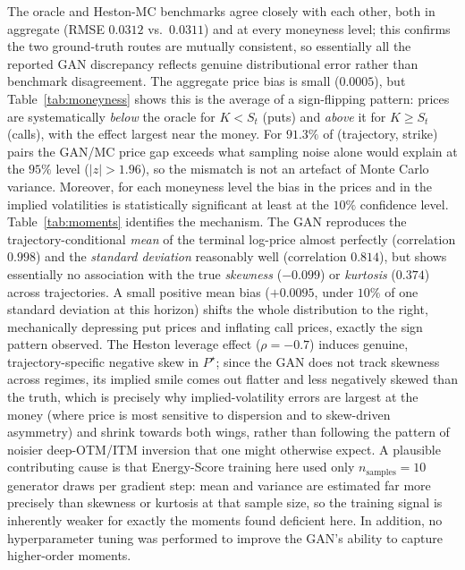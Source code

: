 The oracle and Heston-MC benchmarks agree closely with each other, both
in aggregate (RMSE $0.0312$ vs.\ $0.0311$) and at every moneyness level;
this confirms the two ground-truth routes are mutually consistent, so
essentially all the reported GAN discrepancy reflects genuine
distributional error rather than benchmark disagreement. The aggregate
price bias is small ($0.0005$), but Table~\ref{tab:moneyness} shows this
is the average of a sign-flipping pattern: prices are systematically
\emph{below} the oracle for $K<S_t$ (puts) and \emph{above} it for
$K\ge S_t$ (calls), with the effect largest near the money. For $91.3\%$
of (trajectory, strike) pairs the GAN/MC price gap exceeds what sampling
noise alone would explain at the $95\%$ level ($|z|>1.96$), so the
mismatch is not an artefact of Monte Carlo variance. 
Moreover, for each moneyness level the bias in the prices and in the implied volatilities is statistically significant at least at the $10\%$ confidence level.\\

Table~\ref{tab:moments} identifies the mechanism. The GAN reproduces the
trajectory-conditional \emph{mean} of the terminal log-price almost
perfectly (correlation $0.998$) and the \emph{standard deviation}
reasonably well (correlation $0.814$), but shows essentially no
association with the true \emph{skewness} ($-0.099$) or \emph{kurtosis}
($0.374$) across trajectories. A small positive mean bias ($+0.0095$,
under $10\%$ of one standard deviation at this horizon) shifts the whole
distribution to the right, mechanically depressing put prices and
inflating call prices, exactly the sign pattern observed. The
Heston leverage effect ($\rho=-0.7$) induces genuine, trajectory-specific
negative skew in $P^\star$; since the GAN does not track skewness
across regimes, its implied smile comes out flatter and less negatively
skewed than the truth, which is precisely why implied-volatility errors
are largest at the money (where price is most sensitive to dispersion
and to skew-driven asymmetry) and shrink towards both wings, rather than
following the pattern of noisier deep-OTM/ITM inversion that one might
otherwise expect. A plausible contributing cause is that Energy-Score
training here used only $n_{\text{samples}}=10$ generator draws per
gradient step: mean and variance are estimated far more precisely than
skewness or kurtosis at that sample size, so the training signal is
inherently weaker for exactly the moments found deficient here. 
In addition, no hyperparameter tuning was performed to improve the GAN's ability to capture higher-order moments.



